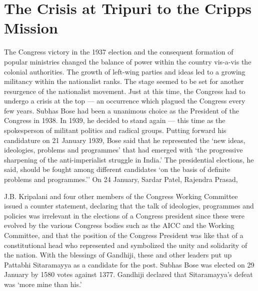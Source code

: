 \chapter{The Crisis at Tripuri to the Cripps Mission}
\begin{multicols}{2}

The Congress victory in the 1937 election and the consequent formation of popular ministries changed the balance of power within the country vis-a-vis the colonial authorities. The growth of left-wing parties and ideas led to a growing militancy within the nationalist ranks. The stage seemed to be set for another resurgence of the nationalist movement. Just at this time, the Congress had to undergo a crisis at the top --- an occurrence which plagued the Congress every few years. Subhas Bose had been a unanimous choice as the President of the Congress in 1938. In 1939, he decided to stand again --- this time as the spokesperson of militant politics and radical groups. Putting forward his candidature on 21 January 1939, Bose said that he represented the `new ideas, ideologies, problems and programmes' that had emerged with `the progressive sharpening of the anti-imperialist struggle in India.' The presidential elections, he said, should be fought among different candidates `on the basis of definite problems and programmes.'' On 24 January, Sardar Patel, Rajendra Prasad, 

J.B. Kripalani and four other members of the Congress Working Committee issued a counter statement, declaring that the talk of ideologies, programmes and policies was irrelevant in the elections of a Congress president since these were evolved by the various Congress bodies such as the AICC and the Working Committee, and that the position of the Congress President was like that of a constitutional head who represented and symbolized the unity and solidarity of the nation. With the blessings of Gandhiji, these and other leaders put up Pattabhi Sitaramayya as a candidate for the post. Subhas Bose was elected on 29 January by 1580 votes against 1377. Gandhiji declared that Sitaramayya's defeat was `more mine than his.' 


\end{multicols}
